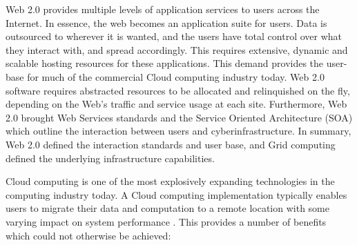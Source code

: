 Web 2.0 provides multiple levels of application services to users across the Internet.  In essence, the web becomes an application suite for users.  Data is outsourced to wherever it is wanted, and the users have total control over what they interact with, and spread accordingly.  This requires extensive, dynamic and scalable hosting resources for these applications. This demand provides the user-base for much of the commercial Cloud computing industry today.  Web 2.0 software requires abstracted resources to be allocated and relinquished on the fly, depending on the Web's traffic and service usage at each site.  Furthermore, Web 2.0 brought Web Services standards \cite{wsci} and the Service Oriented Architecture (SOA) \cite{krafzig2004} which outline the interaction between users and cyberinfrastructure.  In summary, Web 2.0 defined the interaction standards and user base, and Grid computing defined the underlying infrastructure capabilities.  

Cloud computing \cite{Armbrust2010} is one of the most explosively expanding technologies in the computing industry today. A Cloud computing implementation typically enables users to migrate their data and computation to a remote location with some varying impact on system performance \cite{Wang2010}.  This provides a number of benefits which could not otherwise be achieved:  


